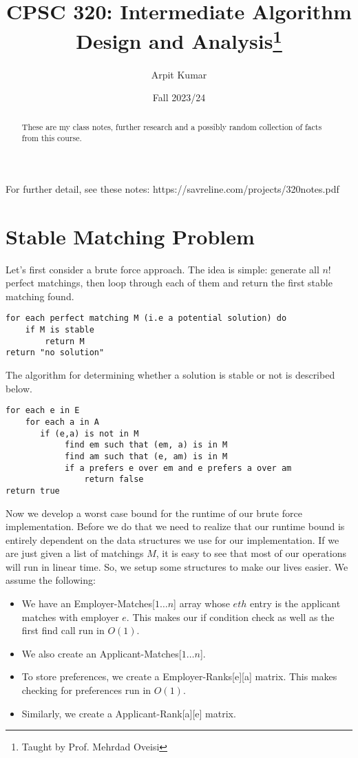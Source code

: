 \documentclass{tufte-handout}
\title{CPSC 320: Intermediate Algorithm Design and Analysis\thanks{Taught by Prof. Mehrdad Oveisi}}
\author[The Tufte-LaTeX Developers]{Arpit Kumar}
\date{Fall 2023/24}  %
\theoremstyle{definition}
\begin{document}
\maketitle%

\begin{abstract}
\noindent These are my class notes, further research and a possibly random collection of facts from this course.
\end{abstract}


For further detail, see these notes: https://savreline.com/projects/320notes.pdf


\section{Stable Matching Problem}
Let's first consider a brute force approach. The idea is simple: generate all $n!$ perfect matchings, then loop through each of them and return the first stable matching found. 

\begin{verbatim}
for each perfect matching M (i.e a potential solution) do
    if M is stable
        return M 
return "no solution"   
\end{verbatim}

The algorithm for determining whether a solution is stable or not is described below.
\begin{verbatim}
for each e in E
    for each a in A
       if (e,a) is not in M
            find em such that (em, a) is in M
            find am such that (e, am) is in M
            if a prefers e over em and e prefers a over am
                return false
return true
\end{verbatim}

Now we develop a worst case bound for the runtime of our brute force implementation. Before we do that we need to realize that our runtime bound is entirely dependent on the data structures we use for our implementation. If we are just given a list of matchings $M$, it is easy to see that most of our operations will run in linear time. So, we setup some structures to make our lives easier. We assume the following:
\begin{itemize}
    \item We have an Employer-Matches[$1\dots n$] array whose $eth$ entry is the applicant matches with employer $e$. This makes our if condition check as well as the first find call run in $O(1)$.
    \item We also create an Applicant-Matches[$1\dots n$].
    \item To store preferences, we create a Employer-Ranks[e][a] matrix. This makes checking for preferences run in $O(1)$.
    \item Similarly, we create a Applicant-Rank[a][e] matrix.
\end{itemize}
\end{document}
